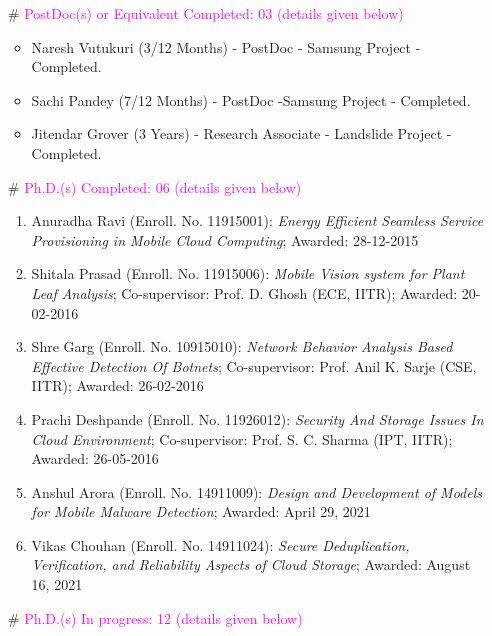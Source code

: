 
   \begin{itemize}

	\item[\#] \textcolor{magenta}{PostDoc(s) or Equivalent Completed: 03 (details given below)}
	
	\begin{itemize}
	\item Naresh Vutukuri (3/12 Months) - PostDoc - Samsung Project - Completed.
	\item Sachi Pandey (7/12 Months) -  PostDoc -Samsung Project - Completed.
	\item Jitendar Grover (3 Years) -  Research Associate - Landslide Project - Completed.
	\end{itemize}


\item[\#] \textcolor{magenta} {Ph.D.(s) Completed: 06 (details given below)}

\begin{enumerate} %
		\item Anuradha Ravi (Enroll. No. 11915001): \textit{Energy Efficient Seamless Service Provisioning in Mobile Cloud Computing}; Awarded: 28-12-2015
		\item Shitala Prasad (Enroll. No. 11915006): \textit{Mobile Vision system for Plant Leaf Analysis}; Co-supervisor: Prof. D. Ghosh (ECE, IITR); Awarded: 20-02-2016
		\item Shre Garg (Enroll. No. 10915010): \textit{Network Behavior Analysis Based Effective Detection Of Botnets}; Co-supervisor: Prof. Anil K. Sarje (CSE, IITR); Awarded: 26-02-2016
		\item Prachi Deshpande (Enroll. No. 11926012): \textit{Security And Storage Issues In Cloud Environment}; Co-supervisor: Prof. S. C. Sharma (IPT, IITR); Awarded: 26-05-2016
		\item Anshul Arora (Enroll. No. 14911009): \textit{Design and Development of Models for Mobile Malware Detection}; Awarded: April 29, 2021
		\item Vikas Chouhan (Enroll. No. 14911024): \textit{Secure Deduplication, Verification, and Reliability Aspects of Cloud Storage}; Awarded: August 16, 2021
			\end{enumerate}

\item[\#] \textcolor{magenta} {Ph.D.(s) In progress: 12 (details given below)}


\end{itemize}
